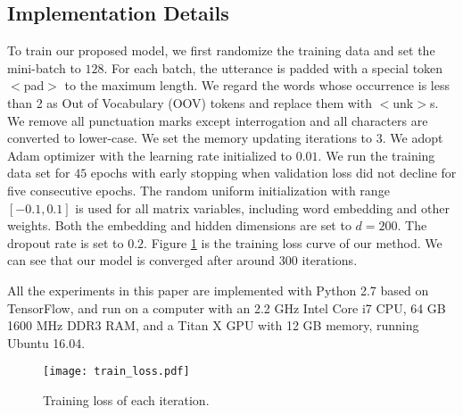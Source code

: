 \documentclass[conference]{IEEEtran}
\begin{document}
	\subsection{Implementation Details}
	To train our proposed model, we first randomize the training data and set the mini-batch to $128$. For each batch, the utterance is padded with a special token $<$pad$>$ to the maximum length. We regard the words whose occurrence is less than 2 as Out of Vocabulary (OOV) tokens and replace them with $<$unk$>$s. We remove all punctuation marks except interrogation and all characters are converted to lower-case. We set the memory updating iterations to $3$. We adopt Adam \cite{kingma2014adam} optimizer with the learning rate initialized to $0.01$. We run the training data set for $45$ epochs with early stopping when validation loss did not decline for five consecutive epochs. The random uniform initialization with range $[-0.1, 0.1]$ is used for all matrix variables, including word embedding and other weights. Both the embedding and hidden dimensions are set to $d = 200$. The dropout rate is set to $0.2$. Figure \ref{fig:training_loss} is the training loss curve of our method. We can see that our model is converged after around $300$ iterations.


	All the experiments in this paper are implemented with Python 2.7 based on TensorFlow, and run on a computer with an 2.2 GHz Intel Core i7 CPU, 64 GB 1600 MHz DDR3 RAM, and a Titan X GPU with 12 GB memory, running Ubuntu 16.04.
	
	\begin{figure}[!t]
		\centering
		\texttt{[image: train\_loss.pdf]}
		\caption{Training loss of each iteration.}
		\label{fig:training_loss}
	\end{figure}
\end{document}

